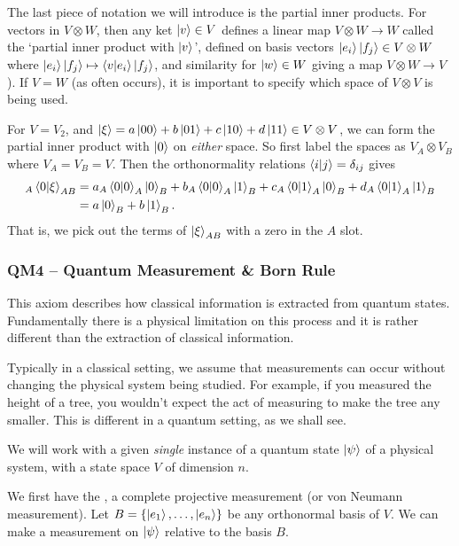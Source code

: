 \documentclass[a4paper]{article}
\begin{document}
The last piece of notation we will introduce is the partial inner products. For vectors in $V \otimes W$, then any ket $\ket{v} \in V$ defines a linear map $V \otimes W \rightarrow W$ called the `partial inner product with $\ket{v}$', defined on basis vectors $\ket{e_i} \ket{f_j} \in V \otimes W$ where $\ket{e_i}\ket{f_j} \mapsto \ip{v}{e_i} \ket{f_j}$, and similarity for $\ket{w} \in W$ giving a map $V \otimes W \rightarrow V$). If $V = W$ (as often occurs), it is important to specify which space of $V \otimes V$ is being used.


\begin{example}
	For $V = V_2$, and $\ket{\xi} = a \ket{00} + b\ket{01} + c \ket{10} + d\ket{11} \in V \otimes V$, we can form the partial inner product with $\ket{0}$ on \emph{either} space. So first label the spaces as $V_A \otimes V_B$ where $V_A = V_B = V$. Then the orthonormality relations $\ip{i}{j} = \delta_{ij}$ gives
	\begin{align*}
		{}_A\ip{0}{\xi}_{AB} &= a {}_A\ip{0}{0}_A \ket{0}_B + b {}_A\ip{0}{0}_A \ket{1}_B + c{}_A\ip{0}{1}_A \ket{0}_B + d{}_A\ip{0}{1}_A \ket{1}_B \\
		&= a\ket{0}_B + b\ket{1}_B. 
	\end{align*}
	That is, we pick out the terms of $\ket{\xi}_{AB}$ with a zero in the $A$ slot.
\end{example}

\subsubsection{QM4 -- Quantum Measurement \& Born Rule}

This axiom describes how classical information is extracted from quantum states. Fundamentally there is a physical limitation on this process and it is rather different than the extraction of classical information.

Typically in a classical setting, we assume that measurements can occur without changing the physical system being studied. For example, if you measured the height of a tree, you wouldn't expect the act of measuring to make the tree any smaller. This is different in a quantum setting, as we shall see.

We will work with a given \emph{single} instance of a quantum state $\ket{\psi}$ of a physical system, with a state space $V$ of dimension $n$.

We first have the , a complete projective measurement (or von Neumann measurement). Let $B = \{\ket{e_1}, \dots, \ket{e_n}\}$ be any orthonormal basis of $V$. We can make a measurement on $\ket{\psi}$ relative to the basis $B$.
\end{document}
